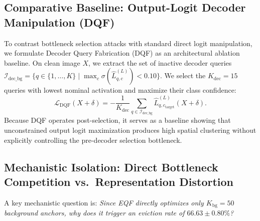 \documentclass[preprint,12pt]{elsarticle}
\begin{document}
\subsection{Comparative Baseline: Output-Logit Decoder Manipulation (DQF)}
To contrast bottleneck selection attacks with standard direct logit manipulation, we formulate Decoder Query Fabrication (DQF) as an architectural ablation baseline. On clean image $X$, we extract the set of inactive decoder queries $\mathcal{I}_{\mathrm{dec\_bg}} = \{ q \in \{1,\dots,K\} \mid \max_c \sigma(\hat{L}_{q, c}^{(L)}) < 0.10 \}$. We select the $K_{\mathrm{dec}} = 15$ queries with lowest nominal activation and maximize their class confidence:
\begin{equation}
    \label{eq:dqf_loss}
    \mathcal{L}_{\mathrm{DQF}}(X + \delta) = - \frac{1}{K_{\mathrm{dec}}} \sum_{q \in \mathcal{I}_{\mathrm{dec\_bg}}} \hat{L}_{q, c_{\mathrm{target}}}^{(L)}(X + \delta).
\end{equation}
Because DQF operates post-selection, it serves as a baseline showing that unconstrained output logit maximization produces high spatial clustering without explicitly controlling the pre-decoder selection bottleneck.

\subsection{Mechanistic Isolation: Direct Bottleneck Competition vs.\ Representation Distortion}
A key mechanistic question is: \textit{Since EQF directly optimizes only $K_{\mathrm{bg}}=50$ background anchors, why does it trigger an eviction rate of $66.63 \pm 0.80\%$?}
\end{document}
